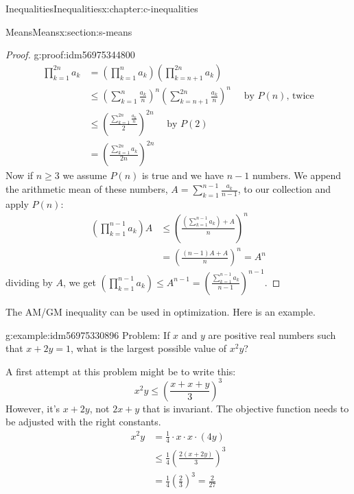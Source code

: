 \documentclass[twoside,10pt,]{book}
\numberwithin{equation}{section}
\begin{document}
\begin{chapterptx}{Inequalities}{}{Inequalities}{}{}{x:chapter:c-inequalities}
\begin{sectionptx}{Means}{}{Means}{}{}{x:section:s-means}
\begin{proof}{}{g:proof:idm56975344800}
\begin{equation*}
\begin{split}
\prod_{k=1}^{2n} a_k &=\left(\prod_{k=1}^{n} a_k \right)\left(\prod_{k=n+1}^{2n} a_k  \right) \\	
& \leq \left(\sum_{k=1}^{n} \frac{a_k}{n} \right)^n \left(\sum_{k=n+1}^{2n} \frac{a_k}{n} \right)^n \quad \textrm{ by }P(n)\textrm{, twice}\\
& \leq \left(\frac{\sum_{k=1}^{2n} \frac{a_k}{n}}{2}\right)^{2n} \quad \textrm{ by }P(2)\\
& = \left(\frac{\sum_{k=1}^{2n} a_k}{2n}\right)^{2n} 
\end{split}
\end{equation*}
Now if \(n \ge 3\) we assume \(P(n)\) is true and we have \(n-1\) numbers. We append the arithmetic mean of these numbers, \(A = \sum_{k=1}^{n-1} \frac{a_k}{n-1}\), to our collection and apply \(P(n)\):%
\begin{equation*}
\begin{split}
\left(\prod_{k=1}^{n-1} a_k\right)A & \leq \left(\frac{\left(\sum_{k=1}^{n-1} a_k\right) + A}{n}\right)^n\\
& = \left( \frac{(n-1)A + A}{n} \right)^n = A^n
\end{split}
\end{equation*}
dividing by \(A\), we get \(\left(\prod_{k=1}^{n-1} a_k\right) \leq A^{n-1} = \left(\frac{\sum_{k=1}^{n-1} a_{k}}{n-1}\right)^{n-1}\).%
\end{proof}
The AM\slash{}GM inequality can be used in optimization.  Here is an example.%
\begin{example}{}{g:example:idm56975330896}%
Problem:  If \(x\) and \(y\) are positive real numbers such that \(x+2y=1\), what is the largest possible value of \(x^2 y\)?%
\par
A first attempt at this problem might be to write this:%
\begin{equation*}
x^2 y \leq  \left( \frac{x + x + y}{3} \right)^3
\end{equation*}
However, it's \(x+2y\), not \(2x + y\) that is invariant. The objective function needs to be adjusted with the right constants.%
\begin{equation*}
\begin{split}
x^2 y &= \frac{1}{4} \cdot x\cdot x\cdot (4 y) \\
&\leq  \frac{1}{4} \left( \frac{2(x+2y)}{3} \right)^3\\
& = \frac{1}{4} \left( \frac{2}{3} \right)^3 = \frac{2}{27} 
\end{split}
\end{equation*}

\end{example}
\end{sectionptx}
\end{chapterptx}
\end{document}
